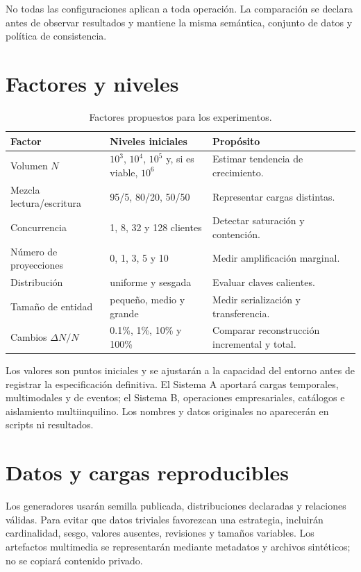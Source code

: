 No todas las configuraciones aplican a toda operación. La comparación se declara antes
de observar resultados y mantiene la misma semántica, conjunto de datos y política de consistencia.

\section{Factores y niveles}

\begin{table}[H]
\centering
\caption{Factores propuestos para los experimentos.}
\label{tab:factores-experimento}
\begin{tabularx}{\textwidth}{p{3.6cm}X X}
\toprule
Factor & Niveles iniciales & Propósito \\
\midrule
Volumen $N$ & $10^3$, $10^4$, $10^5$ y, si es viable, $10^6$ & Estimar tendencia de
crecimiento.\\
Mezcla lectura/escritura & 95/5, 80/20, 50/50 & Representar cargas distintas.\\
Concurrencia & 1, 8, 32 y 128 clientes & Detectar saturación y contención.\\
Número de proyecciones & 0, 1, 3, 5 y 10 & Medir amplificación marginal.\\
Distribución & uniforme y sesgada & Evaluar claves calientes.\\
Tamaño de entidad & pequeño, medio y grande & Medir serialización y transferencia.\\
Cambios $\Delta N/N$ & 0.1\%, 1\%, 10\% y 100\% & Comparar reconstrucción incremental
y total.\\
\bottomrule
\end{tabularx}
\end{table}

Los valores son puntos iniciales y se ajustarán a la capacidad del entorno antes de
registrar la especificación definitiva. El Sistema A aportará cargas temporales,
multimodales y de eventos; el Sistema B, operaciones empresariales, catálogos e
aislamiento multiinquilino. Los nombres y datos originales no aparecerán en scripts ni
resultados.

\section{Datos y cargas reproducibles}

Los generadores usarán semilla publicada, distribuciones declaradas y relaciones
válidas. Para evitar que datos triviales favorezcan una estrategia, incluirán cardinalidad,
sesgo, valores ausentes, revisiones y tamaños variables. Los artefactos multimedia se
representarán mediante metadatos y archivos sintéticos; no se copiará contenido privado.

